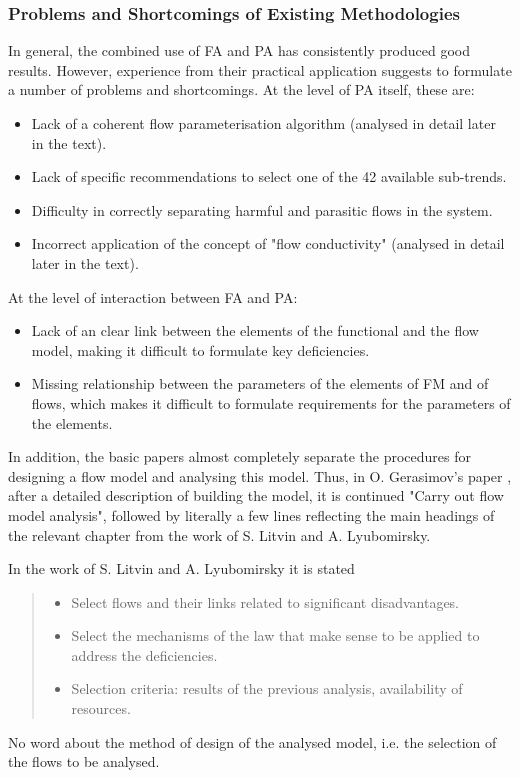 \documentclass[a4paper,11pt]{article}
\begin{document}
\subsubsection*{Problems and Shortcomings of Existing Methodologies}

In general, the combined use of FA and PA has consistently produced good
results. However, experience from their practical application suggests to
formulate a number of problems and shortcomings. At the level of PA itself,
these are:
\begin{itemize}
\item Lack of a coherent flow parameterisation algorithm (analysed in detail
  later in the text).
\item Lack of specific recommendations to select one of the 42 available
  sub-trends.
\item Difficulty in correctly separating harmful and parasitic flows in the
  system.
\item Incorrect application of the concept of "flow conductivity" (analysed in
  detail later in the text).
\end{itemize}
At the level of interaction between FA and PA:
\begin{itemize}
\item Lack of an clear link between the elements of the functional and
  the flow model, making it difficult to formulate key deficiencies.
\item Missing relationship between the parameters of the elements of FM and of
  flows, which makes it difficult to formulate requirements for the parameters
  of the elements.
\end{itemize}
In addition, the basic papers almost completely separate the procedures for
designing a flow model and analysing this model. Thus, in O. Gerasimov's paper
\cite{B9}, after a detailed description of building the model, it is continued 
"Carry out flow model analysis", followed by literally a few lines reflecting
the main headings of the relevant chapter from the work of S. Litvin and
A. Lyubomirsky.

In the work of S. Litvin and A. Lyubomirsky \cite{B6} it is stated
\begin{quote}
  \begin{itemize}
  \item Select flows and their links related to significant disadvantages.
  \item Select the mechanisms of the law that make sense to be applied to
    address the deficiencies.
  \item Selection criteria: results of the previous analysis, availability of
    resources.
  \end{itemize}
\end{quote}
No word about the method of design of the analysed model, i.e. the selection
of the flows to be analysed.
\end{document}
